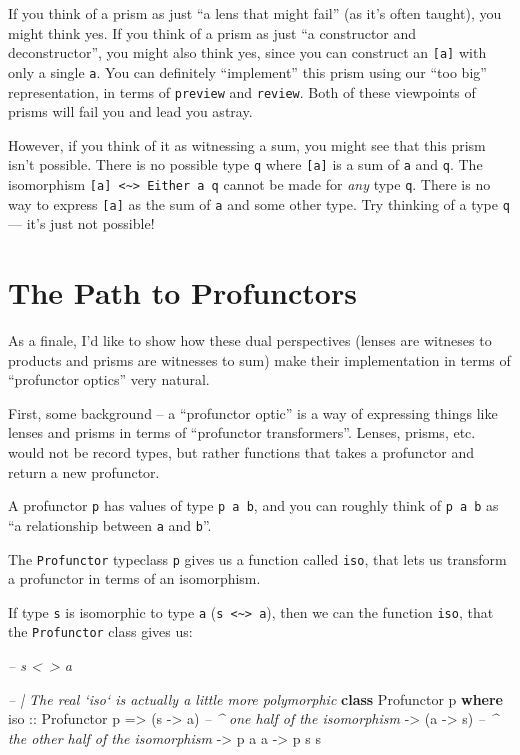 \documentclass[]{article}
\newenvironment{Shaded}{}{}
\newcommand{\CommentTok}[1]{\textcolor[rgb]{0.38,0.63,0.69}{\textit{#1}}}
\newcommand{\DataTypeTok}[1]{\textcolor[rgb]{0.56,0.13,0.00}{#1}}
\newcommand{\KeywordTok}[1]{\textcolor[rgb]{0.00,0.44,0.13}{\textbf{#1}}}
\newcommand{\NormalTok}[1]{#1}
\newcommand{\OtherTok}[1]{\textcolor[rgb]{0.00,0.44,0.13}{#1}}
\begin{document}
If you think of a prism as just ``a lens that might fail'' (as it's often
taught), you might think yes. If you think of a prism as just ``a constructor
and deconstructor'', you might also think yes, since you can construct an
\texttt{{[}a{]}} with only a single \texttt{a}. You can definitely ``implement''
this prism using our ``too big'' representation, in terms of \texttt{preview}
and \texttt{review}. Both of these viewpoints of prisms will fail you and lead
you astray.

However, if you think of it as witnessing a sum, you might see that this prism
isn't possible. There is no possible type \texttt{q} where \texttt{{[}a{]}} is a
sum of \texttt{a} and \texttt{q}. The isomorphism
\texttt{{[}a{]}\ \textless{}\textasciitilde{}\textgreater{}\ Either\ a\ q}
cannot be made for \emph{any} type \texttt{q}. There is no way to express
\texttt{{[}a{]}} as the sum of \texttt{a} and some other type. Try thinking of a
type \texttt{q} --- it's just not possible!

\hypertarget{the-path-to-profunctors}{%
\section{The Path to Profunctors}\label{the-path-to-profunctors}}

As a finale, I'd like to show how these dual perspectives (lenses are witneses
to products and prisms are witnesses to sum) make their implementation in terms
of ``profunctor optics'' very natural.

First, some background -- a ``profunctor optic'' is a way of expressing things
like lenses and prisms in terms of ``profunctor transformers''. Lenses, prisms,
etc. would not be record types, but rather functions that takes a profunctor and
return a new profunctor.

A profunctor \texttt{p} has values of type \texttt{p\ a\ b}, and you can roughly
think of \texttt{p\ a\ b} as ``a relationship between \texttt{a} and
\texttt{b}''.

The \texttt{Profunctor} typeclass \texttt{p} gives us a function called
\texttt{iso}, that lets us transform a profunctor in terms of an isomorphism.

If type \texttt{s} is isomorphic to type \texttt{a}
(\texttt{s\ \textless{}\textasciitilde{}\textgreater{}\ a}), then we can the
function \texttt{iso}, that the \texttt{Profunctor} class gives us:

\begin{Shaded}
\begin{Highlighting}[]
\CommentTok{-- s <~> a}

\CommentTok{-- | The real `iso` is actually a little more polymorphic}
\KeywordTok{class} \DataTypeTok{Profunctor}\NormalTok{ p }\KeywordTok{where}
\OtherTok{    iso ::} \DataTypeTok{Profunctor}\NormalTok{ p}
        \OtherTok{=>}\NormalTok{ (s }\OtherTok{->}\NormalTok{ a)         }\CommentTok{-- ^ one half of the isomorphism}
        \OtherTok{->}\NormalTok{ (a }\OtherTok{->}\NormalTok{ s)         }\CommentTok{-- ^ the other half of the isomorphism}
        \OtherTok{->}\NormalTok{ p a a}
        \OtherTok{->}\NormalTok{ p s s}
\end{Highlighting}
\end{Shaded}
\end{document}
